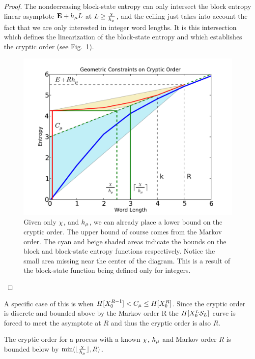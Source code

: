 \begin{proof}
The nondecreasing block-state entropy can only intersect the block entropy linear asymptote ${\bf E} + h_\mu L$ at $L \ge \frac{\chi}{h_\mu}$, and the ceiling just takes into account the fact that we are only interested in integer word lengths. It is this intersection which defines the linearization of the block-state entropy and which establishes the cryptic order (see Fig.~\ref{fig:geometric_contraint}).

\begin{figure}[h!]
\centering
\includegraphics[scale=0.6]{../chapter3/figures/geometric_constraint}
\caption{Given only $\chi$, and $h_\mu$, we can already place a lower bound on the cryptic order. The upper bound of course comes from the Markov order. The cyan and beige shaded areas indicate the bounds on the block and block-state entropy functions respectively. Notice the small area missing near the center of the diagram. This is a result of the block-state function being defined only for integers.}
\label{fig:geometric_contraint}
\end{figure}
\end{proof}

A specific case of this is when $H[{X}_0^{R-1}] < C_\mu \le H[{X}_0^R]$. Since the cryptic order is discrete and bounded above by the Markov order R the $H[{X}_0^L \mathcal{S}_L]$ curve is forced to meet the asymptote at $R$ and thus the cryptic order is also $R$.

\begin{Prop}
The cryptic order for a process with a known $\chi$, $h_\mu$ and Markov order $R$ is bounded below by $\min(\lfloor\frac{\chi}{h_\mu}\rfloor, R)$.
\end{Prop}
 
